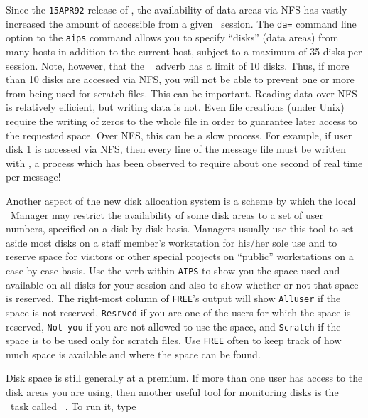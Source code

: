 Since the {\tt 15APR92} release of \AIPS, the availability of data
areas via NFS has vastly increased the amount of 
accessible from a given \AIPS\ session.  The {\tt da=} command line
option to the {\tt aips} command allows you to specify ``disks'' (data
areas) from many hosts in addition to the current host, subject to a
maximum of 35 disks per session.  Note, however, that the {\tt
{}} adverb has a limit of 10 disks.  Thus, if more than 10
disks are accessed via NFS, you will not be able to prevent one or
more from being used for scratch files.  This can be important.
Reading data over NFS is relatively efficient, but writing data is
not.  Even file creations (under Unix) require the writing of zeros to
the whole file in order to guarantee later access to the requested
space.  Over NFS, this can be a slow process.  For example, if user
disk 1 is accessed via NFS, then every line of the message file must
be written with , a process which has been observed to
require about one second of real time per message!

Another aspect of the new disk allocation system is a scheme by which
the local \AIPS\ Manager may restrict the availability of some disk
areas to a set of user numbers, specified on a disk-by-disk basis.
Managers usually use this tool to set aside most disks on a staff
member's workstation for his/her sole use and to reserve space for
visitors or other special projects on ``public'' workstations on a
case-by-case basis.  Use the {\tt {}} verb within {\tt AIPS}
to show you the space used and available on all disks for your session
and also to show whether or not that space is reserved.  The
right-most column of {\tt FREE}'s output will show {\tt Alluser} if
the space is not reserved, {\tt Resrved} if you are one of the users
for which the space is reserved, {\tt Not you} if you are not allowed
to use the space, and {\tt Scratch} if the space is to be used only
for scratch files.  Use {\tt FREE} often to keep track of how much
space is available and where the space can be found.

     Disk space is still generally at a premium.  If more than one
user has access to the disk areas you are using, then another useful
tool for monitoring disks is the \AIPS\ task called \hbox{{\tt
{}}}.  To run it, type
\btd
{}
\etd
{}
\btd
{}
\etd
{}

